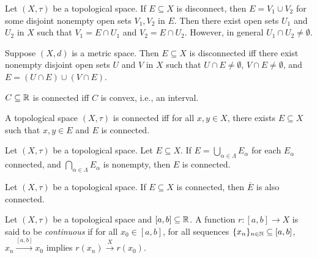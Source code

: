 \documentclass{techreport}
\begin{document}
\begin{remark}\label{Rem:DisconnectedSubsetNotLifting}
	Let $(X,\tau)$ be a topological space.
	If $E \subseteq X$ is disconnect, then $E = V_1 \cup V_2$ for some disjoint nonempty open sets $V_1,V_2$ in $E$.
	Then there exist open sets $U_1$ and $U_2$ in $X$ such that $V_1 = E \cap U_1$ and $V_2 = E \cap U_2$.
	However, in general $U_1 \cap U_2 \neq \emptyset$.
\end{remark}

\begin{proposition}\label{Prop:MetricDisconnectedSubsetLifting}
	Suppose $(X,d)$ is a metric space.
	Then $E \subseteq X$ is disconnected iff there exist nonempty disjoint open sets $U$ and $V$ in $X$ such that $U \cap E \neq \emptyset$, $V \cap E \neq \emptyset$, and $E = (U \cap E) \cup (V \cap E)$.
\end{proposition}

\begin{theorem}\label{The:RConnectedConvex}
	$C \subseteq \mathbb{R}$ is connected iff $C$ is convex, i.e., an interval.
\end{theorem}

\begin{proposition}\label{Prop:ConnIffEveryTwoPointsConn}
	A topological space $(X,\tau)$ is connected iff for all $x,y\in X$, there exists $E \subseteq X$ such that $x,y\in E$ and $E$ is connected.
\end{proposition}

\begin{proposition}\label{Prop:UnionConnStillConn}
	Let $(X,\tau)$ be a topological space.
	Let $E \subseteq X$.
	If $E = \bigcup_{\alpha \in \Lambda} E_\alpha$ for each $E_\alpha$ connected, and $\bigcap_{\alpha \in \Lambda} E_\alpha$ is nonempty, then $E$ is connected.
\end{proposition}

\begin{proposition}\label{Prop:ClosureOfConnStillConn}
	Let $(X,\tau)$ be a topological space.
	If $E \subseteq X$ is connected, then $\overline{E}$ is also connected.
\end{proposition}

\begin{definition}\label{De:ContinuousFromInterval}
	Let $(X,\tau)$ be a topological space and $[a,b] \subseteq \mathbb{R}$.
	A function $r : [a,b] \to X$ is said to be \emph{continuous} if for all $x_0 \in [a,b]$, for all sequences $\{x_n\}_{n \in \mathbb{N}} \subseteq [a,b]$, $x_n \xrightarrow{[a,b]} x_0$ implies $r(x_n) \xrightarrow{X} r(x_0)$.
\end{definition}
\end{document}
